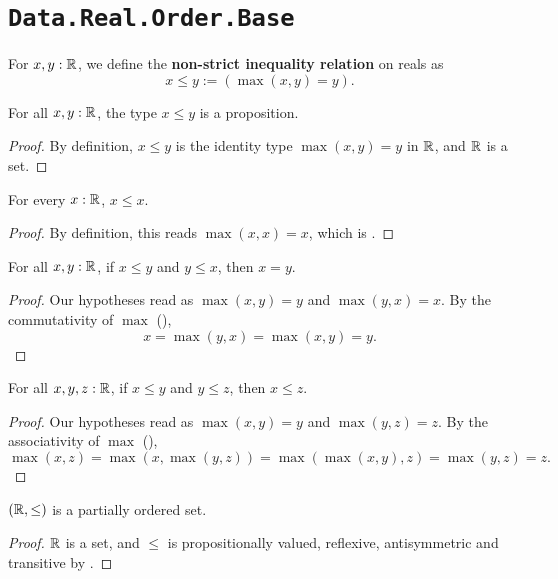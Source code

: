 \section{\texttt{Data.Real.Order.Base}}

\begin{definition}
  \label{leReal}
  For $x, y : \mathbb{R}$, we define the \textbf{non-strict inequality relation} on reals as
  \[
    x \le y := (\max(x, y) = y).
  \]
\end{definition}

\begin{lemma}
  \label{isPropLeReal}
  For all $x, y : \mathbb{R}$, the type $x \le y$ is a proposition.
\end{lemma}
\begin{proof}
  By definition, $x \le y$ is the identity type $\max(x, y) = y$ in $\mathbb{R}$, and $\mathbb{R}$ is a set.
\end{proof}

\begin{lemma}
  \label{isReflLeReal}
  For every $x : \mathbb{R}$, $x \le x$.
\end{lemma}
\begin{proof}
  By definition, this reads $\max(x, x) = x$, which is .
\end{proof}

\begin{lemma}
  \label{isAntisymLeReal}
  For all $x, y : \mathbb{R}$, if $x \le y$ and $y \le x$, then $x = y$.
\end{lemma}
\begin{proof}
  Our hypotheses read as $\max(x, y) = y$ and $\max(y, x) = x$. By the commutativity of $\max$ (),
  \[
    x = \max(y, x) = \max(x, y) = y.
  \]
\end{proof}

\begin{lemma}
  \label{isTransLeReal}
  For all $x, y, z : \mathbb{R}$, if $x \le y$ and $y \le z$, then $x \le z$.
\end{lemma}
\begin{proof}
  Our hypotheses read as $\max(x, y) = y$ and $\max(y, z) = z$. By the associativity of $\max$ (),
  \[
    \max(x, z) = \max(x, \max(y, z)) = \max(\max(x, y), z) = \max(y, z) = z.
  \]
\end{proof}

\begin{corollary}
  \label{RLePoset}
  $(\mathbb{R}, \le)$ is a partially ordered set.
\end{corollary}
\begin{proof}
  $\mathbb{R}$ is a set, and $\le$ is propositionally valued, reflexive, antisymmetric and transitive by .
\end{proof}

